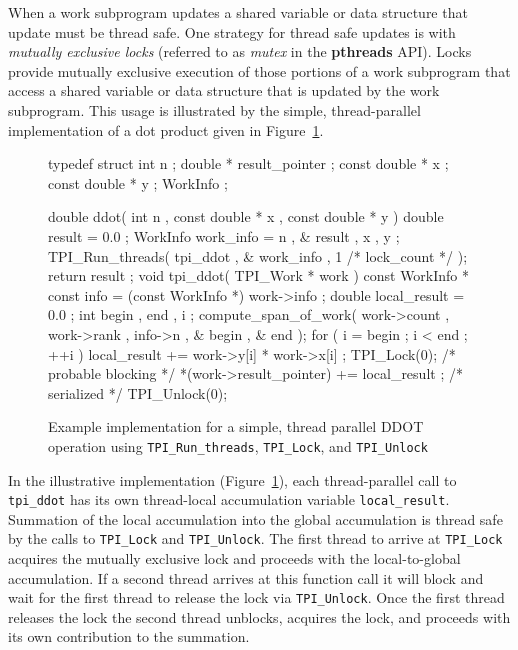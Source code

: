 When a work subprogram updates a shared variable or data structure that update must be thread safe.
%
One strategy for thread safe updates is with \emph{mutually exclusive locks}
(referred to as \emph{mutex} in the \textbf{pthreads} API).
%
Locks provide mutually exclusive execution of those portions of a work subprogram that access a shared variable or data structure that is updated by the work subprogram.
%
This usage is illustrated by the simple, thread-parallel implementation of a dot product given in Figure~\ref{fig:WorkSubprogramDDOTlocking}.

\begin{figure}[h]
\small
\center
\begin{boxedverbatim}
typedef struct {
  int n ;
  double * result_pointer ;
  const double * x ;
  const double * y ;
} WorkInfo ;

double ddot( int n , const double * x , const double * y )
{
  double result = 0.0 ;
  WorkInfo work_info = { n , & result , x , y };
  TPI_Run_threads( tpi_ddot , & work_info , 1 /* lock_count */ );
  return result ;
}
void tpi_ddot( TPI_Work * work )
{
  const WorkInfo * const info = (const WorkInfo *) work->info ;
  double local_result = 0.0 ;
  int begin , end , i ;
  compute_span_of_work( work->count , work->rank , info->n , & begin , & end );
  for ( i = begin ; i < end ; ++i ) {
    local_result += work->y[i] * work->x[i] ;
  }
  TPI_Lock(0);                              /* probable blocking */
  *(work->result_pointer) += local_result ; /* serialized */
  TPI_Unlock(0);
}
\end{boxedverbatim}
\caption{Example implementation for a simple, thread parallel DDOT operation using \texttt{TPI\_Run\_threads}, \texttt{TPI\_Lock}, and \texttt{TPI\_Unlock}}
\label{fig:WorkSubprogramDDOTlocking}
\end{figure}

In the illustrative implementation (Figure~\ref{fig:WorkSubprogramDDOTlocking}), each thread-parallel call to \texttt{tpi\_ddot} has its own thread-local accumulation variable \texttt{local\_result}.
%
Summation of the local accumulation into the global accumulation is thread safe by the calls to \texttt{TPI\_Lock} and \texttt{TPI\_Unlock}.
%
The first thread to arrive at \texttt{TPI\_Lock} acquires the mutually exclusive lock and proceeds with the local-to-global accumulation.
%
If a second thread arrives at this function call it will block and wait for the first thread to release the lock via \texttt{TPI\_Unlock}.
%
Once the first thread releases the lock the second thread unblocks, acquires the lock, and proceeds with its own contribution to the summation.


